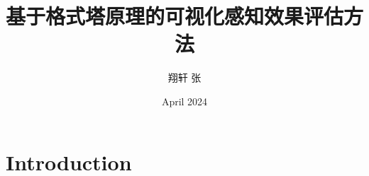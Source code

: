 \documentclass{article}
\title{基于格式塔原理的可视化感知效果评估方法}
\author{翔轩 张}
\date{April 2024}
\begin{document}
\maketitle

\section{Introduction}
\end{document}
